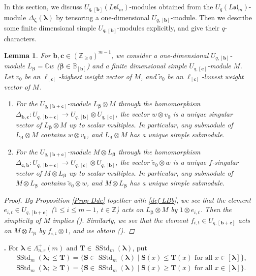 \documentclass[12pt]{amsart}
\newtheorem{lem}[thm]{Lemma}
\def \para{\refstepcounter{thm} \par\medskip\noindent
                \textbf{\thethm .} }
\numberwithin{equation}{thm}
\newcommand\BB{\mathbb B}
\newcommand\CC{\mathbb C}
\newcommand\ZZ{\mathbb Z}
\newcommand\bS{\mathbf S}
\newcommand\bT{\mathbf T}
\newcommand\bb{\mathbf b}
\newcommand\bc{\mathbf c}
\newcommand\D{\Delta}
\newcommand\vL{\varLambda}
\newcommand\Bb{\boldsymbol\beta}
\newcommand\Bz{\boldsymbol\zeta}
\newcommand\Bla{\boldsymbol\lambda}
\newcommand\wt{\widetilde}
\newcommand\ra{\rightarrow}
\newcommand\Fsl{\mathfrak{sl}}
\newcommand{\SStd}{\operatorname{SStd}}
\newcounter{ichi}
\newcommand{\roi}{\roman{ichi}}
\newcounter{ni}
\newcommand{\roii}{\roman{ni}}
\begin{document}
In this section, 
we discuss  $U_{q,[\bb]}(L \Fsl_m)$-modules 
obtained from the $U_q (L\Fsl_m)$-module $\D_{\Bz} (\Bla)$ by tensoring a one-dimensional $U_{q,[\bb]}$-module. 
Then we describe some finite dimensional simple $U_{q,[\bb]}$-modules explicitly, and give their $q$-characters. 

\begin{lem}
\label{Lemma sing LBb M}
For $\bb, \bc \in (\ZZ_{\geq 0})^{m-1}$, 
we consider a one-dimensional $U_{q,[\bb]}$-module $L_{\Bb} = \CC w$ ($\Bb \in \BB_{[\bb]}$) 
and a finite dimensional simple $U_{q,[\bc]}$-module $M$. 
Let $v_0 $ be an $\ell_{[\bc]}$-highest weight vector of $M$, 
and $\wt{v}_0 $ be an $\ell_{[\bc]}$-lowest weight vector of $M$. 

\begin{enumerate}
\item 
For the $U_{q,[\bb + \bc]}$-module $L_{\Bb} \otimes M$ through the homomorphism 
$\D_{\bb, \bc} : U_{q,[\bb + \bc]} \ra U_{q,[\bb]} \otimes U_{q, [\bc]}$, 
the vector $w \otimes v_0$ is a unique singular vector of $L_{\Bb} \otimes M$ up to scalar multiples. 
In particular, any submodule of $L_{\Bb} \otimes M$ contains $w \otimes v_0$, 
and $L_{\Bb} \otimes M$ has a unique simple submodule. 

\item 
For the $U_{q,[\bb+ \bc]}$-module $M \otimes L_{\Bb}$ through the homomorphism 
$\D_{\bc, \bb} : U_{q, [\bb+\bc]} \ra U_{q, [\bc]} \otimes U_{q, [\bb]}$, 
the vector $\wt{v}_0 \otimes w$ is a unique $f$-singular vector of $M \otimes L_{\Bb}$ up to scalar multiples. 
In particular, any submodule of $M \otimes L_{\Bb} $ contains $ \wt{v}_0 \otimes w $, 
and $M \otimes L_{\Bb}$  has a unique simple submodule. 
\end{enumerate}

\begin{proof}
By Proposition \ref{Prop Ddc} together with \eqref{def LBb}, 
we see that the element $e_{i,t} \in U_{q,[\bb + \bc]}$  ($1 \leq i \leq m-1$, $t \in \ZZ$) acts on $L_{\Bb} \otimes M$ 
by $1 \otimes e_{i,t}$. 
Then the simplicity of $M$ implies (\roi). 
Similarly, we see that the element $f_{i,t} \in U_{q,[\bb+\bc]}$ acts on $M \otimes L_{\Bb}$ by $f_{i,t} \otimes 1$, 
and we obtain (\roii). 
\end{proof} 
\end{lem}


\para \label{Sing Bla} 
For $\Bla \in \vL_{n,r}^+(m)$ and $\bT \in \SStd_m(\Bla)$, 
put 
\begin{align*}
&\SStd_m(\Bla; \leq \bT) = \{ \bS \in \SStd_m(\Bla) \mid \bS (x) \leq \bT(x) \text{ for all } x \in [\Bla]\}, 
\\
&\SStd_m(\Bla ; \geq \bT)= \{ \bS \in \SStd_m(\Bla) \mid \bS (x) \geq \bT(x) \text{ for all } x \in [\Bla]\}.
\end{align*}
  
\end{document}
